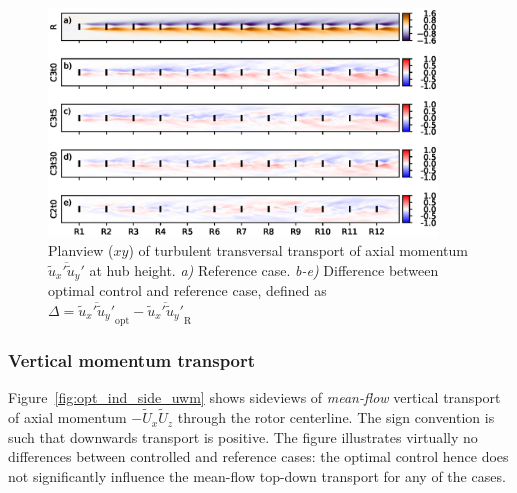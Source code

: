 		\begin{figure}[hbt]
			\centering
			\includegraphics[width=0.92\textwidth]{chapters/optimal_induction_control/topview_uv.eps}
			\caption[Planview ($xy$) of turbulent transversal transport of axial momentum $\overline{\widetilde{u}_x' \widetilde{u}_y'}$ at hub height.]{Planview ($xy$) of turbulent transversal transport of axial momentum $\overline{\widetilde{u}_x' \widetilde{u}_y'}$ at hub height. \emph{a) } Reference case. \emph{b-e)} Difference between optimal control and reference case, defined as $\Delta = \overline{\widetilde{u}_x' \widetilde{u}_y'}_{\text{opt}} - \overline{\widetilde{u}_x' \widetilde{u}_y'}_{\text{R}}$  \label{fig:opt_ind_top_uv}}
		\end{figure}	
	
		\clearpage
	
	
	\subsubsection{Vertical momentum transport}

	Figure~\ref{fig:opt_ind_side_uwm} shows sideviews of \emph{mean-flow} vertical transport of axial momentum $- \widetilde{U}_x \widetilde{U}_z$ through the rotor centerline. The sign convention is such that downwards transport is positive. The figure illustrates virtually no differences between controlled and reference cases: the optimal control hence does not significantly influence the mean-flow top-down transport for any of the cases.

